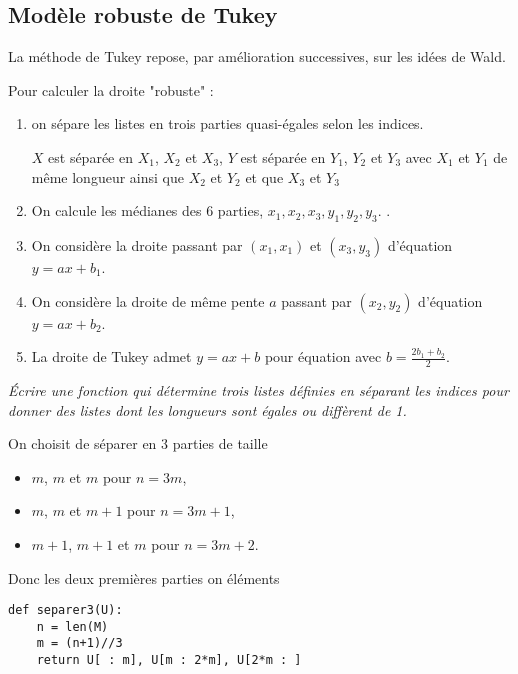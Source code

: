 \subsection{Modèle robuste de Tukey} 
La méthode de Tukey repose, par amélioration successives, sur les idées de Wald.

Pour calculer la droite "robuste" :

\begin{enumerate}
\item on sépare les listes en trois parties quasi-égales selon les indices. 

$X$ est séparée en $X_1$, $X_2$ et $X_3$, $Y$ est séparée en $Y_1$, $Y_2$ et $Y_3$ avec $X_1$ et $Y_1$ de même longueur ainsi que $X_2$ et $Y_2$ et que $X_3$ et $Y_3$

\item On calcule les médianes des 6 parties, $x_1, x_2, x_3, y_1, y_2, y_3$. .

\item On considère la droite passant par $(x_1,x_1)$ et $(x_3,y_3)$ d'équation $y = ax +b_1$.

\item  On considère  la droite de même pente $a$ passant par $(x_2,y_2)$ d'équation $y=ax+b_2$.

\item La droite de Tukey admet $y=ax+b$ pour équation avec $\displaystyle b =\frac{2b_1+b_2}2$.
\end{enumerate}
\begin{Exercise}\it Écrire une fonction  qui détermine trois listes définies en séparant les indices pour donner des listes dont les longueurs sont égales ou diffèrent de 1.
\end{Exercise} 
\begin{Answer} On choisit de séparer en 3 parties de taille
\begin{itemize}
    \item $m$, $m$ et $m$ pour $n = 3m$,
    \item $m$, $m$ et $m+1$ pour $n = 3m+1$,
    \item $m+1$, $m+1$ et $m$ pour $n = 3m+2$.
\end{itemize}
Donc les deux premières parties on  éléments
\begin{lstlisting}
def separer3(U):
    n = len(M)
    m = (n+1)//3
    return U[ : m], U[m : 2*m], U[2*m : ]
\end{lstlisting}
\end{Answer}
